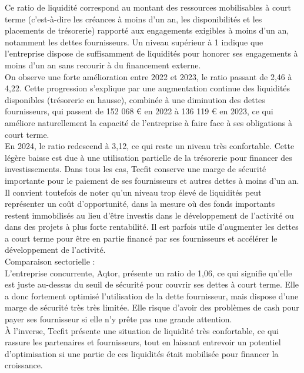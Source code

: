 Ce ratio de liquidité correspond au montant des ressources mobilisables à court terme (c’est-à-dire les créances à moins d’un an, les disponibilités et les placements de trésorerie) rapporté aux engagements exigibles à moins d’un an, notamment les dettes fournisseurs. Un niveau supérieur à 1 indique que l’entreprise dispose de suffisamment de liquidités pour honorer ses engagements à moins d’un an sans recourir à du financement externe.\\
On observe une forte amélioration entre 2022 et 2023, le ratio passant de 2,46 à 4,22. Cette progression s’explique par une augmentation continue des liquidités disponibles (trésorerie en hausse), combinée à une diminution des dettes fournisseurs, qui passent de 152 068 € en 2022 à 136 119 € en 2023, ce qui améliore naturellement la capacité de l’entreprise à faire face à ses obligations à court terme.\\
En 2024, le ratio redescend à 3,12, ce qui reste un niveau très confortable. Cette légère baisse est due à une utilisation partielle de la trésorerie pour financer des investissements.  Dans tous les cas, Tecfit conserve une marge de sécurité importante pour le paiement de ses fournisseurs et autres dettes à moins d’un an.\\
Il convient toutefois de noter qu’un niveau trop élevé de liquidités peut représenter un coût d’opportunité, dans la mesure où des fonds importants restent immobilisés au lieu d’être investis dans le développement de l’activité ou dans des projets à plus forte rentabilité. Il est parfois utile d’augmenter les dettes a court terme pour être en partie financé par ses fournisseurs et accélérer le développement de l’activité.\\
Comparaison sectorielle :\\
L’entreprise concurrente, Aqtor, présente un ratio de 1,06, ce qui signifie qu’elle est juste au-dessus du seuil de sécurité pour couvrir ses dettes à court terme. Elle a donc fortement optimisé l’utilisation de la dette fournisseur, mais dispose d’une marge de sécurité très très limitée. Elle risque d’avoir des problèmes de cash pour payer ses fournisseur si elle n’y prête pas une grande attention.\\
À l’inverse, Tecfit présente une situation de liquidité très confortable, ce qui rassure les partenaires et fournisseurs, tout en laissant entrevoir un potentiel d’optimisation si une partie de ces liquidités était mobilisée pour financer la croissance.\\

